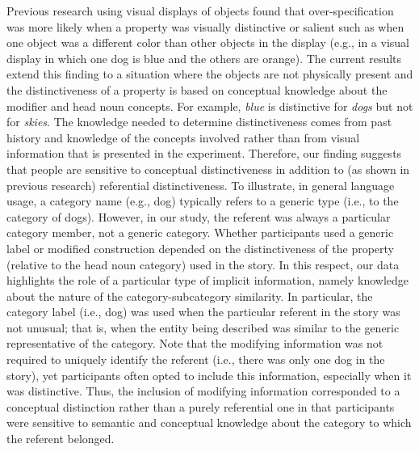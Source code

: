 \documentclass[output=paper]{langsci/langscibook}
\begin{document}
Previous research using visual displays of objects found that
over-specification was more likely when a property was visually
distinctive or salient such as when one object was a different color
than other objects in the display (e.g., in a visual display in which
one dog is blue and the others are orange). The current results extend
this finding to a situation where the objects are not physically
present and the distinctiveness of a property is based on conceptual
knowledge about the modifier and head noun concepts. For example,
\textit{blue} is distinctive for \textit{dogs} but not for
\textit{skies}.  The knowledge needed to determine distinctiveness
comes from past history and knowledge of the concepts involved rather
than from visual information that is presented in the experiment.
Therefore, our finding suggests that people are sensitive to
conceptual distinctiveness in addition to (as shown in previous
research) referential distinctiveness. To illustrate, in general
language usage, a category name (e.g., dog) typically refers to a
generic type (i.e., to the category of dogs).  However, in our study,
the referent was always a particular category member, not a generic
category. Whether participants used a generic label or modified
construction depended on the distinctiveness of the property (relative
to the head noun category) used in the story. In this respect, our
data highlights the role of a particular type of implicit information,
namely knowledge about the nature of the category-subcategory
similarity. In particular, the category label (i.e., dog) was used
when the particular referent in the story was not unusual; that is,
when the entity being described was similar to the generic
representative of the category. Note that the modifying information
was not required to uniquely identify the referent (i.e., there was
only one dog in the story), yet participants often opted to include
this information, especially when it was distinctive. Thus, the
inclusion of modifying information corresponded to a conceptual
distinction rather than a purely referential one in that participants
were sensitive to semantic and conceptual knowledge about the category
to which the referent belonged.
\end{document}
